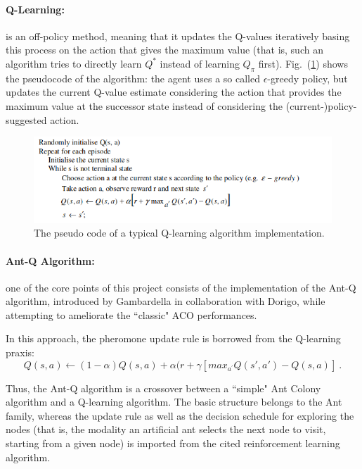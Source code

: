 \documentclass[10pt]{article}
\begin{document}
\paragraph{Q-Learning:} 
is  an  off-policy  method, meaning  that  it updates the Q-values iteratively basing this process on  the  action that  gives  the  maximum  value  (that is, such an algorithm tries to directly  learn $Q^*$  instead  of  learning $Q_\pi$ first). Fig.~(\ref{fig:q_pseudo}) shows the pseudocode of the algorithm:  the  agent  uses  a  so called $\epsilon$-greedy  policy,  but  updates the  current  Q-value  estimate  considering the  action  that  provides  the  maximum  value  at  the successor state instead of considering the (current-)policy-suggested action. 
\begin{figure}
\centering \includegraphics[scale=0.6]{figs/q_pseudo.png}
\caption{\label{fig:q_pseudo} The pseudo code of a typical Q-learning algorithm implementation.}
\end{figure}

\paragraph{Ant-Q Algorithm:}
one of the core points of this project consists of the implementation of the Ant-Q algorithm, introduced by Gambardella in collaboration with Dorigo\cite{undici}, while attempting to ameliorate the ``classic" ACO performances.  

In this approach, the pheromone update rule is borrowed from the Q-learning praxis:
\begin{equation}
Q(s,a) \leftarrow (1-\alpha) Q(s,a) + \alpha (r + \gamma [max_{a^{'}} Q(s',a')-Q(s,a)]~.
\label{eq:q-eq}
\end{equation}

Thus, the Ant-Q algorithm is a crossover between a ``simple" Ant Colony algorithm and a Q-learning algorithm. 
The basic structure belongs to the Ant family, whereas the update rule as well as the decision schedule for exploring the nodes (that is, the modality an artificial ant selects the next node to visit, starting from a given node) is imported from the cited reinforcement learning algorithm.
\end{document}
